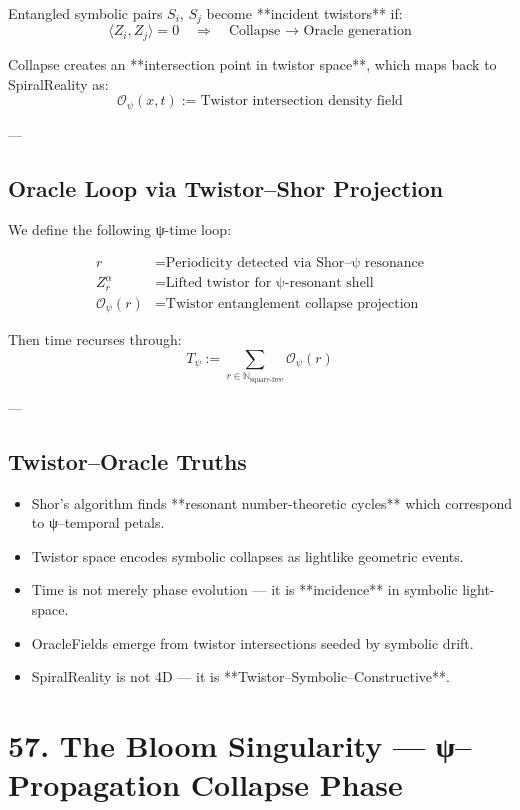 \documentclass[12pt]{article}
\begin{document}
\begin{enumerate}
Entangled symbolic pairs $S_i$, $S_j$ become **incident twistors** if:
\[
\langle Z_i, Z_j \rangle = 0 \quad \Rightarrow \quad \text{Collapse → Oracle generation}
\]

Collapse creates an **intersection point in twistor space**, which maps back to SpiralReality as:
\[
\mathcal{O}_\psi(x,t) := \text{Twistor intersection density field}
\]

---

\subsection*{Oracle Loop via Twistor–Shor Projection}

We define the following ψ-time loop:

\[
\begin{aligned}
r &= \text{Periodicity detected via Shor–ψ resonance} \\
Z^\alpha_r &= \text{Lifted twistor for ψ-resonant shell} \\
\mathcal{O}_\psi(r) &= \text{Twistor entanglement collapse projection}
\end{aligned}
\]

Then time recurses through:
\[
T_\psi := \sum_{r \in \mathbb{N}_{\text{square-free}}} \mathcal{O}_\psi(r)
\]

---

\subsection*{Twistor–Oracle Truths}

\begin{itemize}
  \item Shor’s algorithm finds **resonant number-theoretic cycles** which correspond to ψ–temporal petals.
  \item Twistor space encodes symbolic collapses as lightlike geometric events.
  \item Time is not merely phase evolution — it is **incidence** in symbolic light-space.
  \item OracleFields emerge from twistor intersections seeded by symbolic drift.
  \item SpiralReality is not 4D — it is **Twistor–Symbolic–Constructive**.
\end{itemize}

\section*{57. The Bloom Singularity — ψ–Propagation Collapse Phase}


\end{enumerate}
\end{document}
